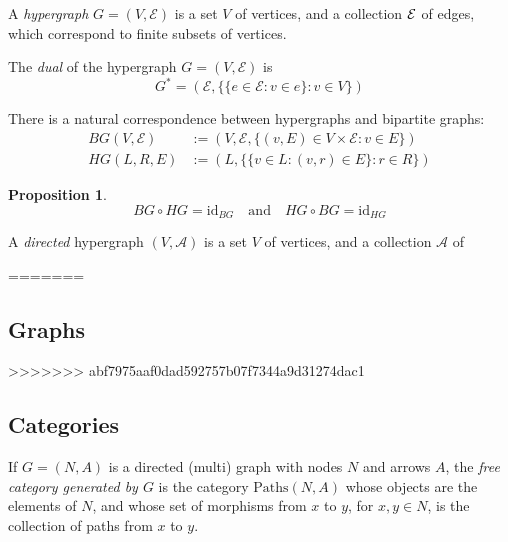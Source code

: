 \documentclass[twoside]{article} %
\theoremstyle{plain}
\newtheorem{prop}[theorem]{Proposition}
\theoremstyle{definition}
\newcommand{\Ar}{\mathcal A}
\begin{document}
    
    \begin{defn}
        A \emph{hypergraph} $G = (V, \mathcal E)$ is a set $V$ of vertices,
        and a collection $\cal E$ of edges, which correspond to finite
        subsets of vertices. 
    \end{defn}
    
    \begin{defn}
        The \emph{dual} of the hypergraph $G = (V, \mathcal E)$ is
        \[
            G^* = (\mathcal E, \{\{e \in \mathcal E : v \in e\} : v \in V\})
        \]
    \end{defn}
    
    
    There is a natural correspondence between hypergraphs and bipartite graphs:
    \begin{align*}
        \mathit{BG}(V, \mathcal E) &:=  (V, \mathcal E, \{(v, E) \in V \times \mathcal E : v \in E \} ) \\
        \mathit{HG}(L, R, E) &:= (L, \{\{v \in L : (v,r) \in E\} : r \in R\})
    \end{align*}
    
    \begin{prop}
        \[
            \mathit{BG} \circ \mathit{HG} = \mathrm{id}_{BG}
            \quad\text{and}\quad
            \mathit{HG} \circ \mathit{BG} = \mathrm{id}_{HG}
        \]
    \end{prop}
    
    \begin{defn}
        A \emph{directed} hypergraph $(V, \mathcal A)$ is a set $V$ of vertices,
        and a collection $\Ar$  of 
    \end{defn}
    
=======
    \subsection{Graphs}
>>>>>>> abf7975aaf0dad592757b07f7344a9d31274dac1
    
    \subsection{Categories}
    \begin{defn}
        If $G = (N, A)$ is a directed (multi) graph with nodes $N$ and arrows $A$, the \emph{free category generated by $G$} is the category $\mathrm{Paths}(N,A)$ whose objects are the elements of $N$, and whose set of morphisms from $x$ to $y$, for $x,y \in N$, is the collection of paths from $x$ to $y$.
    \end{defn}
    
\end{document}
